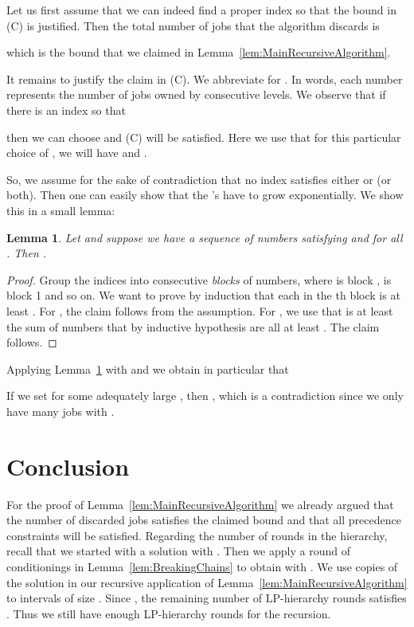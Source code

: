 \documentclass[11pt,letterpaper,oneside,english]{article}
\theoremstyle{theorem}
\newtheorem{lemma}[theorem]{Lemma}
\begin{document}
Let us first assume that we can indeed find a proper index  so that the bound in (C)
is justified. Then the total number of jobs that the algorithm discards
is

which is the bound that we claimed in Lemma~\ref{lem:MainRecursiveAlgorithm}. 

It remains to justify the claim in (C). 
We abbreviate    for  . 
In words, each number  represents the number of jobs owned by  consecutive levels. 
We observe that if there is an index  so that 

then we can choose  and (C) will be satisfied. Here we use that for this particular choice of , 
we will have  and .


So, we assume for the sake of contradiction that no index  satisfies either  or  (or both). 
Then one can easily show that the 's have to grow exponentially. We show this in a small lemma:
\begin{lemma} \label{lem:GrowOfSequenceAlphaIs}
Let   and suppose we have a sequence of numbers  
satisfying  and  for all . 
Then . 
\end{lemma}
\begin{proof}
Group the indices into consecutive \emph{blocks} of  numbers, where  is 
block ,  is block 1 and so on. We want to prove by induction that
each  in the th block is at least . For , the claim follows from the 
assumption. For , we use that  is at least the sum of  numbers 
that by inductive hypothesis are all at least . The claim follows. 
\end{proof}

Applying Lemma~\ref{lem:GrowOfSequenceAlphaIs} with  and
 we obtain in particular that 

If we set  
 for some adequately large , then
 , which is a contradiction
since we only have  many jobs with . 


\section{Conclusion} 

For the proof of Lemma~\ref{lem:MainRecursiveAlgorithm} we already argued that the
number of discarded jobs satisfies the claimed bound and that all precedence constraints
will be satisfied. Regarding the number of rounds in the hierarchy, recall that
we started with a solution  with . Then we apply a round of conditionings in Lemma~\ref{lem:BreakingChains} 
to obtain  with .
We use copies of the solution  in our recursive application of Lemma~\ref{lem:MainRecursiveAlgorithm} to intervals of size . Since , the remaining 
number of LP-hierarchy rounds satisfies . Thus we still have enough LP-hierarchy rounds for the recursion.  
\end{document}
